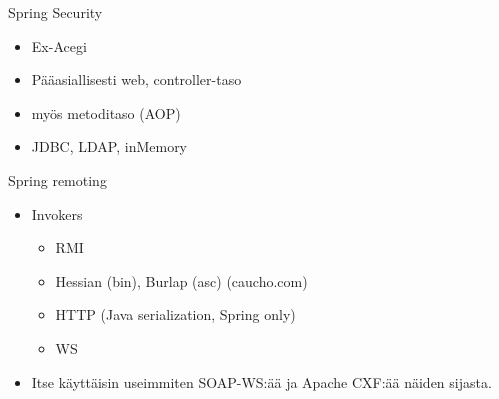 \documentclass[hyperref={pdfauthor=\AUTHOR},14pt]{beamer}
\begin{document}
\begin{frame}{Spring Security}
\begin{itemize}
\item Ex-Acegi
\item Pääasiallisesti web, controller-taso
\item myös metoditaso (AOP)
\item JDBC, LDAP, inMemory
\end{itemize}
\end{frame}

\begin{frame}{Spring remoting}
\begin{itemize}
\item Invokers
\begin{itemize}
\item RMI
\item Hessian (bin), Burlap (asc) (caucho.com)
\item HTTP (Java serialization, Spring only)
\item WS
\end{itemize}
\item Itse käyttäisin useimmiten SOAP-WS:ää ja Apache CXF:ää näiden
  sijasta.
\end{itemize}
\end{frame}
\end{document}
